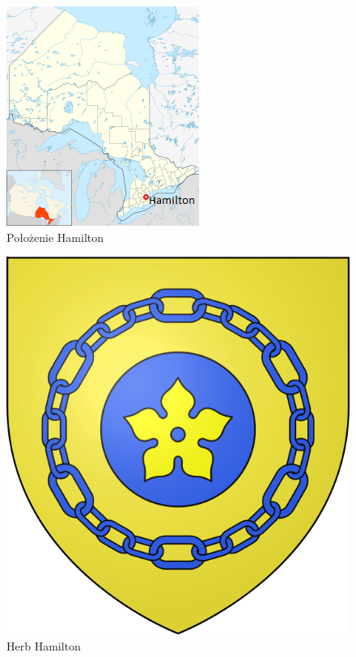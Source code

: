 \documentclass[a4paper,12pt]{article}
\begin{document}
\begin{figure}[h]
\centering
\includegraphics[scale=0.85]{Hamilton.png}
\caption{Położenie Hamilton}\label{fig:Hamilton}
\end{figure}


\begin{figure}[h]
\centering
\includegraphics[scale=0.25]{Herb.png}
\caption{Herb Hamilton}
\end{figure}
\end{document}
